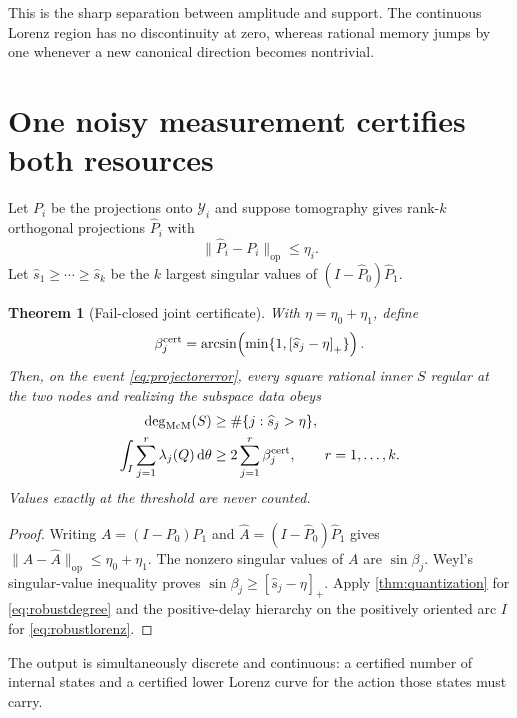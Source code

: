 \documentclass[11pt]{article}
\newtheorem{theorem}{Theorem}[section]
\theoremstyle{definition}
\theoremstyle{remark}
\newcommand{\dd}{\mathrm d}
\newcommand{\mcdeg}{\deg_{\mathrm{McM}}}
\newcommand{\opnorm}[1]{\lVert#1\rVert_{\mathrm{op}}}
\newcommand{\pos}[1]{\left[#1\right]_{+}}
\begin{document}
This is the sharp separation between amplitude and support.  The continuous
Lorenz region has no discontinuity at zero, whereas rational memory jumps by
one whenever a new canonical direction becomes nontrivial.

\section{One noisy measurement certifies both resources}

Let $P_i$ be the projections onto $\mathcal Y_i$ and suppose tomography gives
rank-$k$ orthogonal projections $\widehat P_i$ with
\begin{equation}\label{eq:projectorerror}
 \opnorm{\widehat P_i-P_i}\leq\eta_i.
\end{equation}
Let $\widehat s_1\geq\cdots\geq\widehat s_k$ be the $k$ largest singular
values of $(I-\widehat P_0)\widehat P_1$.

\begin{theorem}[Fail-closed joint certificate]\label{thm:robustprojector}
With $\eta=\eta_0+\eta_1$, define
\begin{equation}\label{eq:certangles}
 \beta_j^{\rm cert}=\arcsin\!\left(\min\{1,\pos{\widehat s_j-\eta}\}\right).
\end{equation}
Then, on the event \eqref{eq:projectorerror}, every square rational inner
$S$ regular at the two nodes and realizing the subspace data obeys
\begin{align}
 \mcdeg(S)&\geq\#\{j:\widehat s_j>\eta\},\label{eq:robustdegree}\\
 \int_I\sum_{j=1}^r\lambda_j(Q)\,\dd\theta
 &\geq2\sum_{j=1}^r\beta_j^{\rm cert},
 \qquad r=1,\ldots,k.\label{eq:robustlorenz}
\end{align}
Values exactly at the threshold are never counted.
\end{theorem}

\begin{proof}
Writing $A=(I-P_0)P_1$ and
$\widehat A=(I-\widehat P_0)\widehat P_1$ gives
$\opnorm{A-\widehat A}\leq\eta_0+\eta_1$.  The nonzero singular values of
$A$ are $\sin\beta_j$.  Weyl's singular-value inequality proves
$\sin\beta_j\geq\pos{\widehat s_j-\eta}$.  Apply
\cref{thm:quantization} for \eqref{eq:robustdegree} and the positive-delay
hierarchy on the positively oriented arc $I$ for \eqref{eq:robustlorenz}.
\end{proof}

The output is simultaneously discrete and continuous: a certified number of
internal states and a certified lower Lorenz curve for the action those states
must carry.
\end{document}
